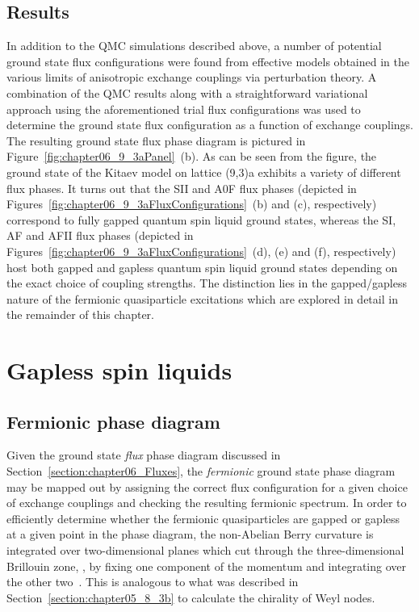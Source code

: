 \subsection{Results}
\label{section:chapter06_QMCResults}
%
%
%
In addition to the QMC simulations described above, a number of potential ground state flux configurations were found from effective models obtained in the various limits of anisotropic exchange couplings via perturbation theory.
A combination of the QMC results along with a straightforward variational approach using the aforementioned trial flux configurations was used to determine the ground state flux configuration as a function of exchange couplings.
The resulting ground state flux phase diagram is pictured in Figure~\ref{fig:chapter06_9_3aPanel}~(b).
As can be seen from the figure, the ground state of the Kitaev model on lattice (9,3)a exhibits a variety of different flux phases.
It turns out that the SII and A0F flux phases (depicted in Figures~\ref{fig:chapter06_9_3aFluxConfigurations}~(b) and (c), respectively) correspond to fully gapped quantum spin liquid ground states, whereas the SI, AF and AFII flux phases (depicted in Figures~\ref{fig:chapter06_9_3aFluxConfigurations}~(d), (e) and (f), respectively) host both gapped and gapless quantum spin liquid ground states depending on the exact choice of coupling strengths.
The distinction lies in the gapped/gapless nature of the fermionic quasiparticle excitations which are explored in detail in the remainder of this chapter.


%
%
\section{Gapless spin liquids}
\label{section:chapter06_GaplessSpinLiquids}
%
%
\subsection{Fermionic phase diagram}
\label{section:chapter06_GaplessPhaseDiagram}
%
%
Given the ground state \textit{flux} phase diagram discussed in Section~\ref{section:chapter06_Fluxes}, the \textit{fermionic} ground state phase diagram may be mapped out by assigning the correct flux configuration for a given choice of exchange couplings and checking the resulting fermionic spectrum.
In order to efficiently determine whether the fermionic quasiparticles are gapped or gapless at a given point in the phase diagram, the non-Abelian Berry curvature is integrated over two-dimensional planes which cut through the three-dimensional Brillouin zone, \ie, by fixing one component of the momentum and integrating over the other two~\cite{FukuiJPS2005}.
This is analogous to what was described in Section~\ref{section:chapter05_8_3b} to calculate the chirality of Weyl nodes.

